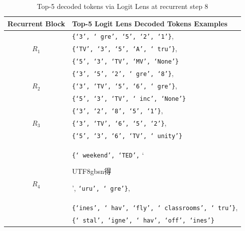 \documentclass{article} %
\begin{document}
    \begin{table}[H]  %
        \centering
        \begin{tabularx}{\columnwidth}{|c|X|}
            \hline
            \textbf{Recurrent Block} & \textbf{Top-5 Logit Lens Decoded Tokens Examples} \\
            \hline
            \multirow{3}{*}{$R_1$} & \texttt{\{`3', ` gre', `5', `2', `1'\}},\\
            & \texttt{\{`TV', `3', `5', `A', ` tru'\}},\\
            & \texttt{\{`5', `3', `TV', `MV', `None'\}}\\
            \hline
            \multirow{3}{*}{$R_2$} & \texttt{\{`3', `5', `2', ` gre', `8'\}},\\
            & \texttt{\{`3', `TV', `5', `6', ` gre'\}},\\
            & \texttt{\{`5', `3', `TV', ` inc', `None'\}}\\
            \hline
            \multirow{3}{*}{$R_3$} & \texttt{\{`3', `2', `8', `5', `1'\}},\\
            & \texttt{\{`3', `TV', `6', `5', `2'\}},\\
            &\texttt{\{`5', `3', `6', `TV', ` unity'\}}\\
            \hline
            \multirow{3}{*}{$R_4$}& \texttt{\{` weekend', `TED',} `\begin{CJK}{UTF8}{gbsn}得\end{CJK}', \texttt{`uru', ` gre'\}}, \\
            & \texttt{\{`ines', ` hav', `fly', ` classrooms', ` tru'\}},\\
            & \texttt{\{` stal', `igne', ` hav', `off', `ines'\}}\\
            \hline
        \end{tabularx}
        \caption{Top-5 decoded tokens via Logit Lens at recurrent step 8}
        \label{tab:logit-r8}
    \end{table}
\end{document}

